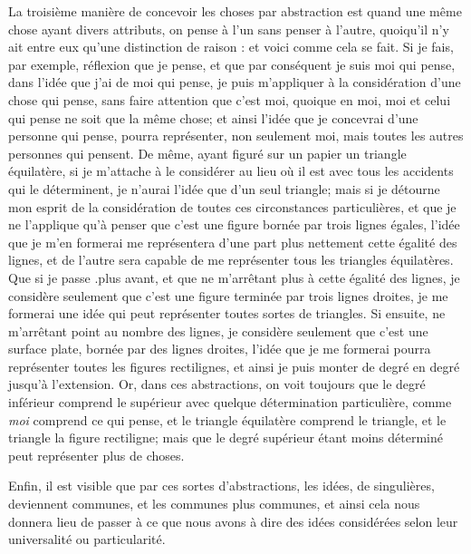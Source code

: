 La troisième manière de concevoir les choses par abstraction est quand une même chose ayant divers attributs, on pense à l'un sans penser à l'autre, quoiqu'il n'y ait entre eux qu'une distinction de raison : et voici comme cela se fait. Si je fais, par exemple, réflexion que je pense, et que par conséquent je suis moi qui pense, dans l'idée que j'ai de moi qui pense, je puis m'appliquer à la considération d'une chose qui pense, sans faire attention que c'est moi, quoique en moi, moi et celui qui pense ne soit que la même chose; et ainsi l'idée que je concevrai d'une personne qui pense, pourra représenter, non seulement moi, mais toutes les autres personnes qui pensent. De même, ayant figuré sur un papier un triangle équilatère, si je m'attache à le considérer au lieu où il est avec tous les accidents qui le déterminent, je n'aurai l'idée que d'un seul triangle; mais si je détourne mon esprit de la considération de toutes ces circonstances particulières, et que je ne l'applique qu'à penser que c'est une figure bornée par trois lignes égales, l'idée que je m'en formerai me représentera d'une part plus nettement cette égalité des lignes, et de l'autre sera capable de me représenter tous les triangles équilatères. Que si je passe .plus avant, et que ne m'arrêtant plus à cette égalité des lignes, je considère seulement que c'est une figure terminée par trois lignes droites, je me formerai une idée qui peut représenter toutes sortes de triangles. Si ensuite, ne m'arrêtant point au nombre des lignes, je considère seulement que c'est une surface plate, bornée par des lignes droites, l'idée que je me formerai pourra représenter toutes les figures rectilignes, et ainsi je puis monter de degré en degré jusqu'à l'extension. Or, dans ces abstractions, on voit toujours que le degré inférieur comprend le supérieur avec quelque détermination particulière, comme \emph{moi} comprend ce qui pense, et le triangle équilatère comprend le triangle, et le triangle la figure rectiligne; mais que le degré supérieur étant moins déterminé peut représenter plus de choses.

Enfin, il est visible que par ces sortes d'abstractions, les idées, de singulières, deviennent communes, et les communes plus communes, et ainsi cela nous donnera lieu de passer à ce que nous avons à dire des idées considérées selon leur universalité ou particularité.
